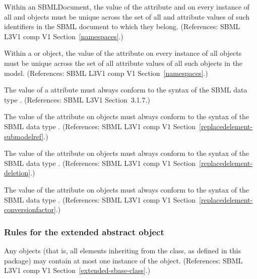 \begin{sbmlenum}
 {  Within an SBMLDocument, the value of the
  attribute  and  on every instance of all
  \Model and \ExternalModelDefinition objects must
  be unique across the set of all  and 
  attribute values of such identifiers in the SBML document to which
  they belong.
  (References: SBML L3V1 comp V1 Section~\ref{namespaces}.) }


 {  Within a \Model or \ExternalModelDefinition
  object, the value of the attribute  on every instance
  of all \Port objects must be unique across the set of all
   attribute values of all such objects in the model.
  (References: SBML L3V1 comp V1 Section~\ref{namespaces}.) }


 { The value of a  attribute must
  always conform to the syntax of the SBML data type .
  (References: SBML L3V1 Section~3.1.7.)}

  
 { The value of the  attribute on
  \ReplacedElement objects must always conform to the syntax of
  the SBML data type .
  (References: SBML L3V1 comp V1 Section~\ref{replacedelement-submodelref}.) }
 
  
 { The value of the  attribute on
  \ReplacedElement objects must always conform to the syntax of
  the SBML data type .
  (References: SBML L3V1 comp V1 Section~\ref{replacedelement-deletion}.) }

  
 { The value of the  attribute on
  \ReplacedElement objects must always conform to the syntax of
  the SBML data type .
  (References: SBML L3V1 comp V1 Section~\ref{replacedelement-conversionfactor}.) }
  

\end{sbmlenum} \subsubsection*{Rules for the extended  abstract object} \begin{sbmlenum}

 { Any \SBase objects (that is, all elements inheriting
  from the \SBase class, as defined in this package) may contain at most one 
  instance of the \ListOfReplacedElements object.
  (References: SBML L3V1 comp V1 Section~\ref{extended-sbase-class}.) }



\end{sbmlenum}

